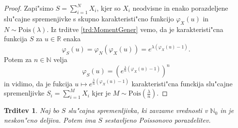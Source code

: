 \documentclass[12pt, a4paper, reqno]{amsart}
\theoremstyle{definition}
\theoremstyle{plain}
\newtheorem{trditev}[definicija]{Trditev}
\newcommand{\R}{\mathbb{R}}
\newcommand{\N}{\mathbb{N}}
\newcommand{\1}{\mathds{1}}
\newcommand{\Pois}[1]{\text{Pois}(#1)}
\begin{document}
    \begin{proof}
        Zapi"simo $S = \sum_{i=1}^NX_i$, kjer so $X_i$ neodvisne in enako porazdeljene slu"cajne 
        spremenjivke s skupno karakteristi"cno funkcijo $\varphi_X(u)$ in $N\sim\Pois{\lambda}$. Iz 
        trditve \ref{trd:MomentGener} vemo, da je karakteristi"cna funkcija $S$ za $u\in \R$ enaka
        \begin{equation*}
            \varphi_S(u) = \varphi_N\left(\varphi_X(u)\right) = e^{\lambda\left(\varphi_X(u) - 1\right)}.
        \end{equation*}
        Potem za $n\in\N$ velja
        \begin{equation*}
            \varphi_{S}(u) = \left(e^{\frac{\lambda}{n}\left(\varphi_X(u) - 1\right)}\right)^n
        \end{equation*}
        in vidimo, da je fukcija $u\mapsto e^{\frac{\lambda}{n}\left(\varphi_X(u) - 1\right)}$ karakteristi"cna
        funckija slu"cajne spremenljivke $S_i = \sum_{i = 1}^MX_i$ kjer je $M\sim\Pois{\tfrac{\lambda}{n}}$.
    \end{proof}

    \begin{trditev}
        Naj bo $S$ slu"cajna spremenljivka, ki zavzame vrednosti v $\N_0$ in je neskon"cno deljiva.
        Potem ima $S$ sestavljeno Poissonovo porazdelitev.
        \label{trd:neskoncnoDeljivaYslediCPD}
    \end{trditev}
\end{document}

